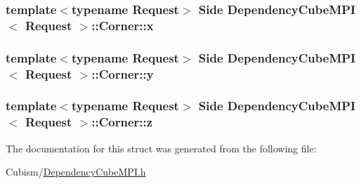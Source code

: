 \subsubsection[{x}]{\setlength{\rightskip}{0pt plus 5cm}template$<$typename Request$>$ Side {\bf Dependency\+Cube\+M\+P\+I}$<$ Request $>$\+::Corner\+::x}\label{struct_dependency_cube_m_p_i_1_1_corner_a941a0145078d057ead36939decc93c67}
\hypertarget{struct_dependency_cube_m_p_i_1_1_corner_a76652bdcfac8ac1f4484bf56e1fe06ef}{}
\subsubsection[{y}]{\setlength{\rightskip}{0pt plus 5cm}template$<$typename Request$>$ Side {\bf Dependency\+Cube\+M\+P\+I}$<$ Request $>$\+::Corner\+::y}\label{struct_dependency_cube_m_p_i_1_1_corner_a76652bdcfac8ac1f4484bf56e1fe06ef}
\hypertarget{struct_dependency_cube_m_p_i_1_1_corner_aa9cfcf5cb03be02597c5d1d07fda5e97}{}
\subsubsection[{z}]{\setlength{\rightskip}{0pt plus 5cm}template$<$typename Request$>$ Side {\bf Dependency\+Cube\+M\+P\+I}$<$ Request $>$\+::Corner\+::z}\label{struct_dependency_cube_m_p_i_1_1_corner_aa9cfcf5cb03be02597c5d1d07fda5e97}


The documentation for this struct was generated from the following file\+:\begin{DoxyCompactItemize}
\item 
Cubism/\hyperlink{_dependency_cube_m_p_i_8h}{Dependency\+Cube\+M\+P\+I.\+h}\end{DoxyCompactItemize}
